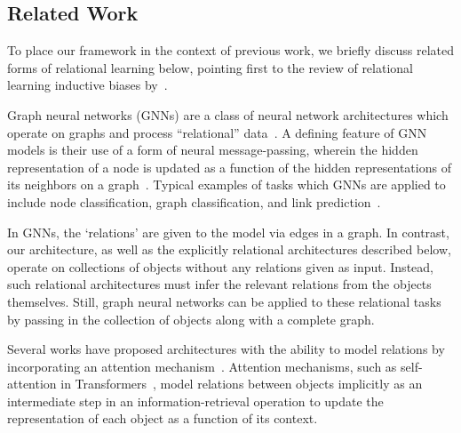 \subsection{Related Work}\label{ssec:related_work}

To place our framework in the context of previous work, we briefly discuss related forms of relational learning below, pointing first to the review of relational learning inductive biases by~\citet{battagliaRelationalInductiveBiases2018}.

{Graph neural networks} (GNNs) are a class of neural network architectures which operate on graphs and process ``relational'' data~\citep[e.g.,][]{niepertLearningConvolutionalNeural2016,kipfSemiSupervisedClassificationGraph2017,schlichtkrullModelingRelationalData2017,velickovicGraphAttentionNetworks2017,kipfNeuralRelationalInference2018,xuHowPowerfulAre2018}. A defining feature of GNN models is their use of a form of neural message-passing, wherein the hidden representation of a node is updated as a function of the hidden representations of its neighbors on a graph~\citep{gilmerNeuralMessagePassing2017}. Typical examples of tasks which GNNs are applied to include node classification, graph classification, and link prediction~\citep{hamiltonGraphRepresentationLearning2020}. %

In GNNs, the `relations' are given to the model via edges in a graph. In contrast, our architecture, as well as the explicitly relational architectures described below, operate on collections of objects without any relations given as input. Instead, such relational architectures must infer the relevant relations from the objects themselves. Still, graph neural networks can be applied to these relational tasks by passing in the collection of objects along with a complete graph. %

Several works have proposed architectures with the ability to model relations by incorporating an {attention mechanism}~\citep[e.g.,][]{vaswani2017attention,velickovicGraphAttentionNetworks2017,santoroRelationalRecurrent2018,zambaldiDeepReinforcementLearning2018,locatelloObjectCentricLearningSlot2020}. Attention mechanisms, such as self-attention in Transformers~\citep{vaswani2017attention}, model relations between objects implicitly as an intermediate step in an information-retrieval operation
to update the representation of each object as a function of its context.

